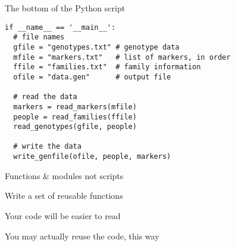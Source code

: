 \documentclass[12pt,t]{beamer}
\begin{document}
\begin{frame}[fragile]{The bottom of the Python script}

\vspace{18pt}

\begin{lstlisting}
if __name__ == '__main__':
  # file names
  gfile = "genotypes.txt" # genotype data
  mfile = "markers.txt"   # list of markers, in order
  ffile = "families.txt"  # family information
  ofile = "data.gen"      # output file

  # read the data
  markers = read_markers(mfile)
  people = read_families(ffile)
  read_genotypes(gfile, people)

  # write the data
  write_genfile(ofile, people, markers)
\end{lstlisting}

\end{frame}


\begin{frame}{Functions \& modules not scripts}

\bbi
\item Write a set of reusable functions
\item Your code will be easier to read
\item You may actually reuse the code, this way
\ei

\end{frame}
\end{document}
